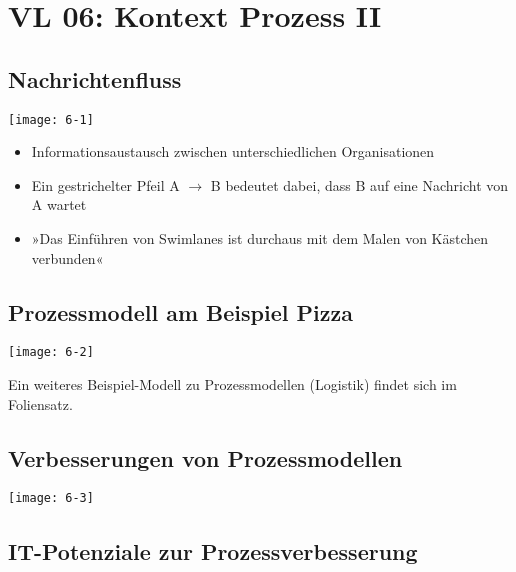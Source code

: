 \section{VL 06: Kontext Prozess II}

\subsection{Nachrichtenfluss}

\texttt{[image: 6-1]}

\begin{itemize}
  \item Informationsaustausch zwischen unterschiedlichen Organisationen
  \item Ein gestrichelter Pfeil A $\rightarrow$ B bedeutet dabei, dass B auf eine Nachricht von A wartet
  \item »Das Einführen von Swimlanes ist durchaus mit dem Malen von Kästchen verbunden«
\end{itemize}


\subsection{Prozessmodell am Beispiel Pizza}

\texttt{[image: 6-2]}

Ein weiteres Beispiel-Modell zu Prozessmodellen (Logistik) findet sich im Foliensatz.


\subsection{Verbesserungen von Prozessmodellen}

\texttt{[image: 6-3]}


\subsection{IT-Potenziale zur Prozessverbesserung}

